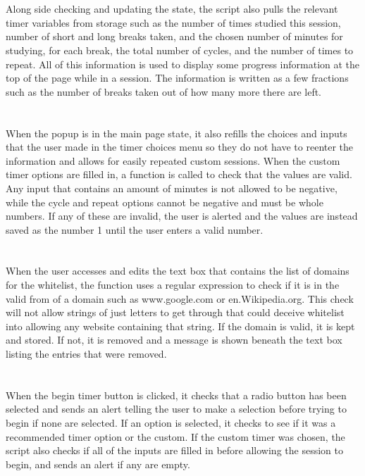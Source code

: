 \documentclass[12pt]{article}
\begin{document}
\\\\Along side checking and updating the state, the script also pulls the relevant timer variables from storage such as
the number of times studied this session, number of short and long breaks taken, and the chosen number of minutes
for studying, for each break, the total number of cycles, and the number of times to repeat. All of this information is used to display some progress information at the top of
the page while in a session. The information is written as a few fractions such as the number of breaks taken out of how many more there are left.\\

\\\\When the popup is in the main page state, it also refills the choices and inputs that the user made
in the timer choices menu so they do not have to reenter the information and allows for easily repeated custom sessions. 
When the custom timer options are filled in, a function is called to check that the values are valid. Any input that contains an amount of minutes is not allowed to be negative, 
while the cycle and repeat options cannot be negative and must be whole numbers. If any of these are invalid, the user is alerted and the values are instead saved as the number 1 
until the user enters a valid number. \\

\\\\When the user accesses and edits the text box that contains the list of domains for the whitelist,
the function uses a regular expression to check if it is in the valid from of a domain such as www.google.com or en.Wikipedia.org.
This check will not allow strings of just letters to get through that could deceive whitelist into allowing any website containing that string. 
If the domain is valid, it is kept and stored.
If not, it is removed and a message is shown beneath the text box listing the entries that were removed.\\

\\\\When the begin timer button is clicked, it checks that a radio button has been selected and sends an alert telling
the user to make a selection before trying to begin if none are selected. If an option is selected, it checks to see if it was a recommended timer option or the custom.
If the custom timer was chosen, the script also checks if all of the inputs are filled in before allowing the session to begin, and sends an alert if any are empty.\\
\end{document}
